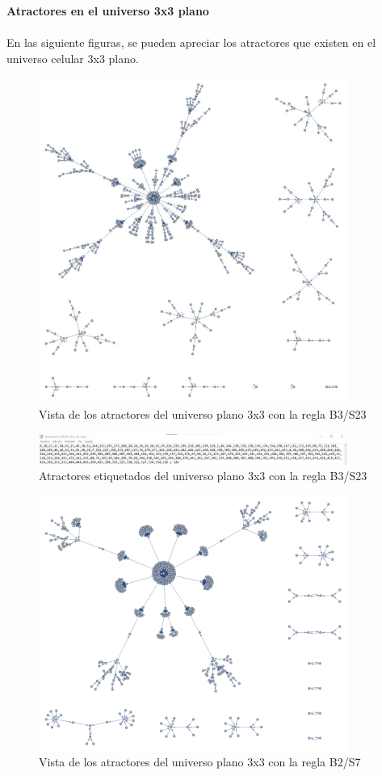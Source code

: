 \documentclass[12pt,a4paper]{book}
\begin{document}
	\textbf{Atractores en el universo 3x3 plano}
	\\\\
	En las siguiente figuras, se pueden apreciar los atractores que existen en el universo celular 3x3 plano.
	\begin{figure}[H]
		\centering
		\includegraphics[width=0.9\textwidth]{imagen17PC}
		\caption{Vista de los atractores del universo plano 3x3 con la regla B3/S23}
	\end{figure}
\begin{figure}[H]
	\centering
	\includegraphics[width=0.9\textwidth]{imagen18PC}
	\caption{Atractores etiquetados del universo plano 3x3 con la regla B3/S23}
\end{figure}
\begin{figure}[H]
	\centering
	\includegraphics[width=0.9\textwidth]{imagen19PC}
	\caption{Vista de los atractores del universo plano 3x3 con la regla B2/S7}
\end{figure}
\end{document}
